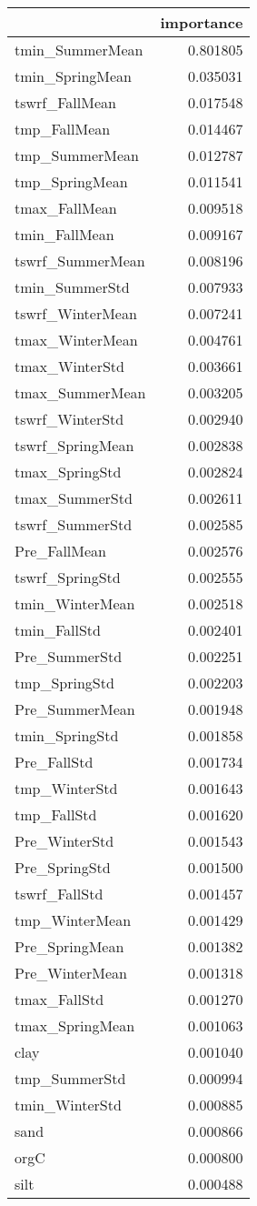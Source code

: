 \begin{tabular}{lr}
\toprule
 & importance \\
\midrule
tmin_SummerMean & 0.801805 \\
tmin_SpringMean & 0.035031 \\
tswrf_FallMean & 0.017548 \\
tmp_FallMean & 0.014467 \\
tmp_SummerMean & 0.012787 \\
tmp_SpringMean & 0.011541 \\
tmax_FallMean & 0.009518 \\
tmin_FallMean & 0.009167 \\
tswrf_SummerMean & 0.008196 \\
tmin_SummerStd & 0.007933 \\
tswrf_WinterMean & 0.007241 \\
tmax_WinterMean & 0.004761 \\
tmax_WinterStd & 0.003661 \\
tmax_SummerMean & 0.003205 \\
tswrf_WinterStd & 0.002940 \\
tswrf_SpringMean & 0.002838 \\
tmax_SpringStd & 0.002824 \\
tmax_SummerStd & 0.002611 \\
tswrf_SummerStd & 0.002585 \\
Pre_FallMean & 0.002576 \\
tswrf_SpringStd & 0.002555 \\
tmin_WinterMean & 0.002518 \\
tmin_FallStd & 0.002401 \\
Pre_SummerStd & 0.002251 \\
tmp_SpringStd & 0.002203 \\
Pre_SummerMean & 0.001948 \\
tmin_SpringStd & 0.001858 \\
Pre_FallStd & 0.001734 \\
tmp_WinterStd & 0.001643 \\
tmp_FallStd & 0.001620 \\
Pre_WinterStd & 0.001543 \\
Pre_SpringStd & 0.001500 \\
tswrf_FallStd & 0.001457 \\
tmp_WinterMean & 0.001429 \\
Pre_SpringMean & 0.001382 \\
Pre_WinterMean & 0.001318 \\
tmax_FallStd & 0.001270 \\
tmax_SpringMean & 0.001063 \\
clay & 0.001040 \\
tmp_SummerStd & 0.000994 \\
tmin_WinterStd & 0.000885 \\
sand & 0.000866 \\
orgC & 0.000800 \\
silt & 0.000488 \\
\bottomrule
\end{tabular}
